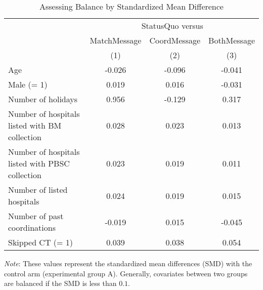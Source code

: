 \documentclass[12pt, a4paper]{article}
\begin{document}
\begin{table}[H]

\caption{\label{tab:smd-balance}Assessing Balance by Standardized Mean Difference}
\centering
\fontsize{8}{10}\selectfont
\begin{threeparttable}
\begin{tabular}[t]{lccc}
\toprule
\multicolumn{1}{c}{ } & \multicolumn{3}{c}{StatusQuo versus} \\
\cmidrule(l{3pt}r{3pt}){2-4}
\multicolumn{1}{c}{ } & \multicolumn{1}{c}{MatchMessage} & \multicolumn{1}{c}{CoordMessage} & \multicolumn{1}{c}{BothMessage} \\
\cmidrule(l{3pt}r{3pt}){2-2} \cmidrule(l{3pt}r{3pt}){3-3} \cmidrule(l{3pt}r{3pt}){4-4}
 & (1) & (2) & (3)\\
\midrule
Age & -0.026 & -0.096 & -0.041\\
Male (= 1) & 0.019 & 0.016 & -0.031\\
Number of holidays & 0.956 & -0.129 & 0.317\\
Number of hospitals listed with BM collection & 0.028 & 0.023 & 0.013\\
Number of hospitals listed with PBSC collection & 0.023 & 0.019 & 0.011\\
Number of listed hospitals & 0.024 & 0.019 & 0.015\\
Number of past coordinations & -0.019 & 0.015 & -0.045\\
Skipped CT (= 1) & 0.039 & 0.038 & 0.054\\
\bottomrule
\end{tabular}
\begin{tablenotes}
\item \emph{Note}: These values represent the standardized mean differences (SMD) with the control arm (experimental group A). Generally, covariates between two groups are balanced if the SMD is less than $0.1$.
\end{tablenotes}
\end{threeparttable}
\end{table}
\end{document}

